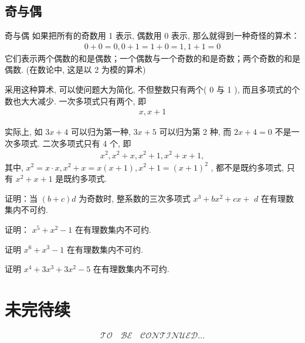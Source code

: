 \documentclass[aspectratio=169]{ctexbeamer}
\theoremstyle{definition}
\begin{document}
\subsection{奇与偶}
\begin{frame}{奇与偶}
	如果把所有的奇数用 1 表示, 偶数用 0 表示, 那么就得到一种奇怪的算术：
	\begin{align*}
		0+0=0,0+1=1+0=1,1+1=0
	\end{align*}
	它们表示两个偶数的和是偶数；一个偶数与一个奇数的和是奇数；两个奇数的和是偶数. (在数论中, 这是以 2 为模的算术)

	采用这种算术, 可以使问题大为简化, 不但整数只有两个( 0 与 1 ), 而且多项式的个数也大大减少. 一次多项式只有两个, 即
	\begin{align*}
		x, x+1
	\end{align*}

	实际上, 如 $3 x+4$ 可以归为第一种,  $3 x+5$ 可以归为第 2 种, 而 $2 x+4=0$ 不是一次多项式. 二次多项式只有 4 个, 即
	\begin{align*}
		x^{2}, x^{2}+x, x^{2}+1, x^{2}+x+1,
	\end{align*}
	其中,  $x^{2}=x \cdot x, x^{2}+x=x(x+1), x^{2}+1=(x+1)^{2}$ , 都不是既约多项式, 只有 $x^{2}+x+1$ 是既约多项式.
\end{frame}

\begin{frame}[t]
	\begin{example}
		证明：当 $(b+c) d$ 为奇数时, 整系数的三次多项式 $x^{3}+b x^{2}+c x+$ $d$ 在有理数集内不可约.
	\end{example}
\end{frame}

\begin{frame}[t]
	\begin{example}
		证明： $x^{5}+x^{2}-1$ 在有理数集内不可约.
	\end{example}
\end{frame}

\begin{frame}[t]
	\begin{example}
		证明 $x^{6}+x^{3}-1$ 在有理数集内不可约.
	\end{example}
\end{frame}

\begin{frame}[t]
\begin{example}
	证明 $x^{4}+3 x^{3}+3 x^{2}-5$ 在有理数集内不可约.
\end{example}
\end{frame}

\section*{未完待续}
\begin{frame}
	\Huge
	$$
		\mathcal{TO}	\quad
		\mathcal{BE}  	\quad
		\mathcal{CONTINUED}
		\ldots
	$$
\end{frame}
\end{document}
